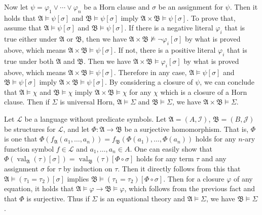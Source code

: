 \documentclass[12pt]{article}
\newcommand{\val}{\mathop{\mathrm{val}}}
\theoremstyle{definition}
\newenvironment{customthm}[1]
  {\renewcommand\theinnercustomthm{#1}\innercustomthm}
  {\endinnercustomthm}
\begin{document}
\begin{customthm}{II.14.3}
Now let $\psi=\varphi_1\vee\cdots\vee\varphi_n$ be a Horn clause and $\sigma$ be an assignment for $\psi$. Then it holds that $\mathfrak{A}\models\psi[\sigma]$ and $\mathfrak{B}\models\psi[\sigma]$ imply $\mathfrak{A}\times\mathfrak{B}\models\psi[\sigma]$. To prove that, assume that $\mathfrak{A}\models\psi[\sigma]$ and $\mathfrak{B}\models\psi[\sigma]$. If there is a negative literal $\varphi_i$ that is true either under $\mathfrak{A}$ or $\mathfrak{B}$, then we have $\mathfrak{A}\times\mathfrak{B}\not\models\neg\varphi_i[\sigma]$ by what is proved above, which means $\mathfrak{A}\times\mathfrak{B}\models\psi[\sigma]$. If not, there is a positive literal $\varphi_i$ that is true under both $\mathfrak{A}$ and $\mathfrak{B}$. Then we have $\mathfrak{A}\times\mathfrak{B}\models\varphi_i[\sigma]$ by what is proved above, which means $\mathfrak{A}\times\mathfrak{B}\models\psi[\sigma]$. Therefore in any case, $\mathfrak{A}\models\psi[\sigma]$ and $\mathfrak{B}\models\psi[\sigma]$ imply $\mathfrak{A}\times\mathfrak{B}\models\psi[\sigma]$. By considering a closure of $\psi$, we can conclude that $\mathfrak{A}\models\chi$ and $\mathfrak{B}\models\chi$ imply $\mathfrak{A}\times\mathfrak{B}\models\chi$ for any $\chi$ which is a closure of a Horn clause. Then if $\Sigma$ is universal Horn, $\mathfrak{A}\models\Sigma$ and $\mathfrak{B}\models\Sigma$, we have $\mathfrak{A}\times\mathfrak{B}\models\Sigma$.
\end{customthm}

\begin{customthm}{II.14.4} Let $\mathcal{L}$ be a language without predicate symbols. Let $\mathfrak{A}=(A,\mathcal{I})$, $\mathfrak{B}=(B,\mathcal{J})$ be structures for $\mathcal{L}$, and let $\Phi:\mathfrak{A}\rightarrow\mathfrak{B}$ be a surjective homomorphism. That is, $\Phi$ is one that $\Phi(f_\mathfrak{A}(a_1,\ldots,a_n))=f_\mathfrak{B}(\Phi(a_1),\ldots,\Phi(a_n))$ holds for any $n$-ary function symbol $f\in\mathcal{L}$ and $a_1,\ldots,a_n\in A$. One can easily show that $\Phi(\val_\mathfrak{A}(\tau)[\sigma])=\val_\mathfrak{B}(\tau)[\Phi\circ\sigma]$ holds for any term $\tau$ and any assignment $\sigma$ for $\tau$ by induction on $\tau$. Then it directly follows from this that $\mathfrak{A}\models(\tau_1=\tau_2)[\sigma]$ implies $\mathfrak{B}\models(\tau_1=\tau_2)[\Phi\circ\sigma]$. Then for a closure $\varphi$ of any equation, it holds that $\mathfrak{A}\models\varphi\rightarrow\mathfrak{B}\models\varphi$, which follows from the previous fact and that $\Phi$ is surjective. Thus if $\Sigma$ is an equational theory and $\mathfrak{A}\models\Sigma$, we have $\mathfrak{B}\models\Sigma$.
\end{customthm}
\end{document}
